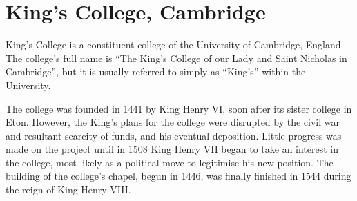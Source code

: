 \documentclass{report}
\begin{document}

\section{King's College, Cambridge}


King's College is a constituent college of the University of Cambridge, 
England. The college's full name is ``The King's College of our Lady and Saint 
Nicholas in Cambridge'', but it is usually referred to simply as ``King's''
within the University.

The college was founded in 1441 by King Henry VI, soon after its sister college 
in Eton. However, the King's plans for the college were disrupted by the civil 
war and resultant scarcity of funds, and his eventual deposition. Little 
progress was made on the project until in 1508 King Henry VII began to take an 
interest in the college, most likely as a political move to legitimise his new 
position. The building of the college's chapel, begun in 1446, was finally 
finished in 1544 during the reign of King Henry VIII.




\end{document}
